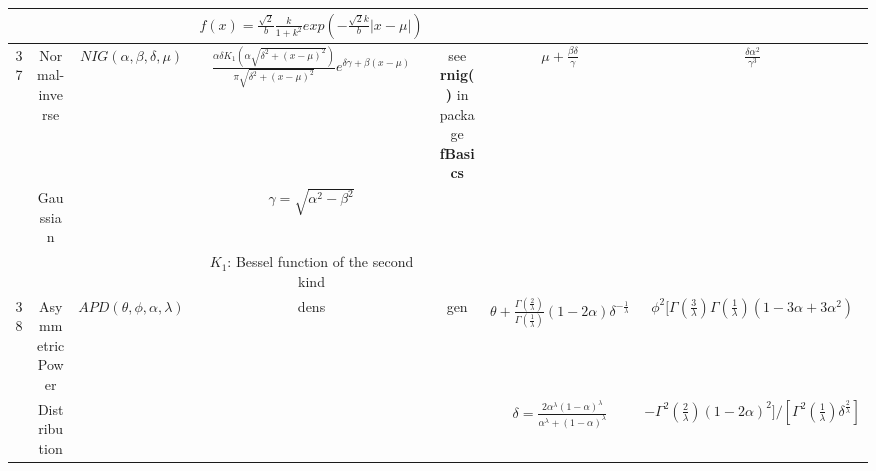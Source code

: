 \documentclass[10pt]{article}
\begin{document}
\begin{landscape}
\begin{center}
{\begin{longtable}{|c|c|c|c|c|c|c|}
   &                 & & $f(x)=\frac{\sqrt{2}}{b} \frac{k}{1+k^2} exp\left(-\frac{\sqrt{2}k}{b}|x-\mu|\right)$ & & & \\
\hline
37 & Normal-inverse & $NIG(\alpha,\beta,\delta,\mu)$
                    & $\frac{\alpha\delta K_1(\alpha\sqrt{\delta^2+(x-\mu)^2})}{\pi\sqrt{\delta^2+(x-\mu)^2}}e^{\delta\gamma+\beta(x-\mu)}$
                    & see \textbf{rnig()} in package \textbf{fBasics} & $\mu + \frac{\beta\delta}{\gamma}$
                    & $\frac{\delta\alpha^2}{\gamma^3}$ \\
   & Gaussian       & & $\gamma = \sqrt{\alpha^2 - \beta^2}$ & & & \\
   &                & & $K_1$: Bessel function of the second kind & & & \\
\hline
38 & Asymmetric Power & $APD(\theta,\phi,\alpha,\lambda)$ & dens & gen & $\theta + \frac{\Gamma\left(\frac{2}{\lambda}\right)}{\Gamma\left(\frac{1}{\lambda}\right)}(1-2\alpha)\delta^{-\frac{1}{\lambda}}$ & $\phi^2[\Gamma\left(\frac{3}{\lambda}\right)\Gamma\left(\frac{1}{\lambda}\right)(1-3\alpha+3\alpha^2)$\\
& Distribution & & & & $\delta=\frac{2\alpha^{\lambda}(1-\alpha)^{\lambda}}{\alpha^{\lambda}+(1-\alpha)^{\lambda}}$ & $- \Gamma^2\left(\frac{2}{\lambda}\right)(1-2\alpha)^2]/[\Gamma^2\left(\frac{1}{\lambda}\right)\delta^{\frac{2}{\lambda}}]$\\
\end{longtable}
}
\end{center}
\end{landscape}
\end{document}

